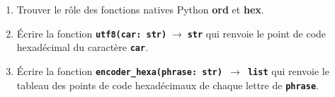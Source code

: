 \documentclass[a4paper,11pt]{article}
\begin{document}
\begin{exo}
    \begin{enumerate}
        \item Trouver le rôle des fonctions natives Python \textbf{ord} et \textbf{hex}.
        \item Écrire la fonction \texttt{\textbf{utf8(car: str)$\;\rightarrow\;$str}} qui renvoie le point de code hexadécimal du caractère \textbf{\texttt{car}}.
        \item Écrire la fonction \textbf{\texttt{encoder\_hexa(phrase: str) $\rightarrow$ list}} qui renvoie le tableau des points de code hexadécimaux de chaque lettre de \textbf{\texttt{phrase}}.
    \end{enumerate}
\end{exo}
\end{document}
